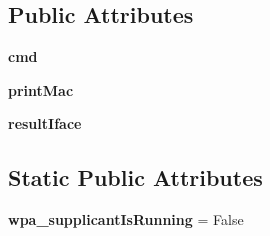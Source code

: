 \subsection*{Public Attributes}
\begin{DoxyCompactItemize}
\item 
\hypertarget{classmininet_1_1wifiAccessPoint_1_1accessPoint_a20057ad02224e80fcaa67868ab5f60a3}{{\bfseries cmd}}\label{classmininet_1_1wifiAccessPoint_1_1accessPoint_a20057ad02224e80fcaa67868ab5f60a3}

\item 
\hypertarget{classmininet_1_1wifiAccessPoint_1_1accessPoint_ae04725d76f113a3f5199607377d628ed}{{\bfseries print\-Mac}}\label{classmininet_1_1wifiAccessPoint_1_1accessPoint_ae04725d76f113a3f5199607377d628ed}

\item 
\hypertarget{classmininet_1_1wifiAccessPoint_1_1accessPoint_a5db7a34156843e0448717005af6a378c}{{\bfseries result\-Iface}}\label{classmininet_1_1wifiAccessPoint_1_1accessPoint_a5db7a34156843e0448717005af6a378c}

\end{DoxyCompactItemize}
\subsection*{Static Public Attributes}
\begin{DoxyCompactItemize}
\item 
\hypertarget{classmininet_1_1wifiAccessPoint_1_1accessPoint_a5a829add942982d08a12a19e7b914586}{{\bfseries wpa\-\_\-supplicant\-Is\-Running} = False}\label{classmininet_1_1wifiAccessPoint_1_1accessPoint_a5a829add942982d08a12a19e7b914586}

\end{DoxyCompactItemize}


